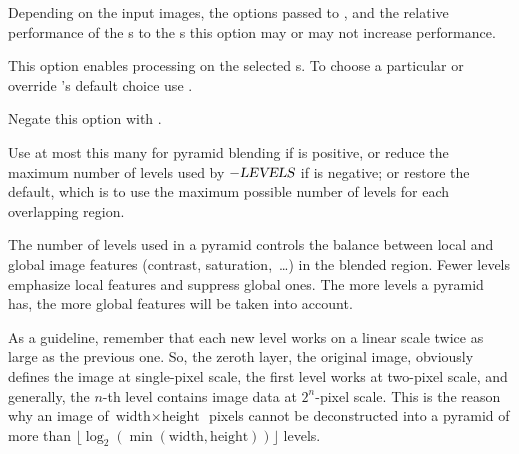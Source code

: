\begin{codelist}
  Depending on the input images, the options passed to \App{}, and the
  relative performance of the s to the s
  this option may or may not increase performance.

  This option enables  processing on the selected
  s.  To choose a particular  or override
  \App's default choice use
  .

  Negate this option with
  .


  \label{opt:levels}%
\item[\itempar{-l \metavar{LEVELS} \\ --levels=\metavar{LEVELS}}]\itemend
  Use at most this many %
  for pyramid\footnotemark{} blending if  is positive,
  or reduce the maximum number of levels used by $-\textsl{LEVELS}$
  if  is negative;  or 
  restore the default, which is to use the maximum possible number of
  levels for each overlapping region.


  The number of levels used in a pyramid controls the balance between
  local and global image features (contrast, saturation,~\dots) in the
  blended region.  Fewer levels emphasize local features and suppress
  global ones.  The more levels a pyramid has, the more global
  features will be taken into account.

  \begin{geeknote}
    As a guideline, remember that each new level works on a linear
    scale twice as large as the previous one.  So, the zeroth layer,
    the original image, obviously defines the image at single-pixel
    scale, the first level works at two-pixel scale, and generally,
    the $n$-th level contains image data at $2^n$-pixel scale.  This
    is the reason why an image of $\mbox{width} \times
    \mbox{height}$~pixels cannot be deconstructed into a pyramid of
    more than $\lfloor \log_2(\min(\mbox{width}, \mbox{height}))
    \rfloor$ levels.


\end{geeknote}
\end{codelist}
